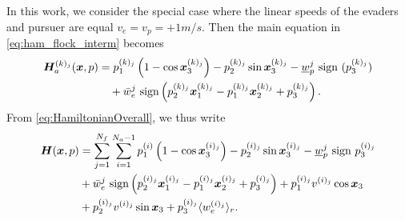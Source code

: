 %
In this work, we consider the special case where the linear speeds of the evaders and pursuer are equal \ie $v_e = v_p = +1 m/s$.  Then the main equation in \eqref{eq:ham_flock_interm} becomes 
%
\begin{align}
\bm{H}^{(k)_j}_a(\bm{x}, p) &= p_1^{(k)_j} \left(1 - \cos \bm{x}_3^{(k)_j}\right) - p_2^{(k)_j} \sin \bm{x}_3^{(k)_j} - \underline{w}_p^j \text{ sign }(p_3^{(k)_j}) \nonumber 	\\
& \quad +  \bar{w}_e^j \text{ sign}\left(p_2^{(k)_j} \bm{x}_1^{(k)_j} - p_1^{(k)_j}\bm{x}_2^{(k)_j} + p_3^{(k)_j}\right)  .
\end{align}
%
From \eqref{eq:HamiltonianOverall}, we thus write
%
\begin{align}
\hamfunc(\state, p) &= \sum_{j=1}^{N_f} \sum_{i=1}^{N_a-1} p_1^{(i)} \left(1 - \cos \state_3^{(i)_j}\right) - p_2^{(i)_j} \sin \state_3^{(i)_j} - \underline{w}_p^j \text{ sign } p_3^{(i)_j}  
%
\nonumber 	\\
%
& 
+ \bar{w}_e^j \text{ sign} \left( p_2^{(i)_j} \state_1^{(i)_j} - p_1^{(i)_j}\state_2^{(i)_j} + p_3^{(i)_j}\right) +
%
p_1^{(i)_j}v^{(i)_j} \cos \state_3 
%
\nonumber 	\\
%
&+ p_2^{(i)_j} v^{(i)_j} \sin \state_3 + p_3^{(i)_j} \langle w_e^{(i)_j}\rangle_r.
\label{eq:HamiltonianCompletada}
\end{align}
%

